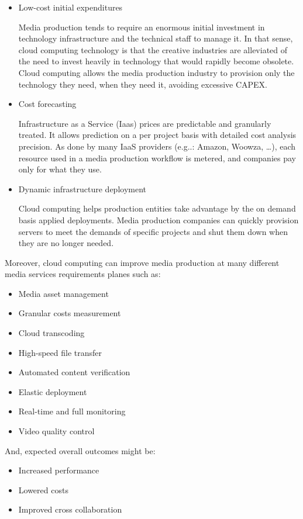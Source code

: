 \begin{itemize}
\item Low-cost initial expenditures \hfill 

Media production tends to require an enormous initial investment in technology infrastructure and the technical staff to manage it. In that sense, cloud computing technology is that the creative industries are alleviated of the need to invest heavily in technology that would rapidly become obsolete. Cloud computing allows the media production industry to provision only the technology they need, when they need it, avoiding excessive CAPEX.

\item Cost forecasting\hfill 

Infrastructure as a Service (Iaas) prices are predictable and granularly treated. It allows prediction on a per project basis with detailed cost analysis precision. As done by many IaaS providers (e.g..: Amazon, Woowza, \ldots), each resource used in a media production workflow is metered, and companies pay only for what they use.

\item Dynamic infrastructure deployment \hfill 

Cloud computing helps production entities take advantage by the on demand basis applied deployments. Media production companies can quickly provision servers to meet the demands of specific projects and shut them down when they are no longer needed.
\end{itemize}

Moreover, cloud computing can improve media production at many different media services requirements planes such as:

\begin{itemize}
\item Media asset management
\item Granular costs measurement
\item Cloud transcoding
\item High-speed file transfer
\item Automated content verification
\item Elastic deployment
\item Real-time and full monitoring
\item Video quality control
\end{itemize}

And, expected overall outcomes might be:

\begin{itemize}
\item Increased performance
\item Lowered costs
\item Improved cross collaboration
\end{itemize}

